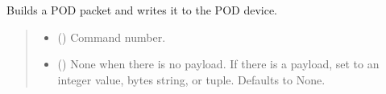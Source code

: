 \documentclass[letterpaper,10pt,english]{sphinxmanual}
\begin{document}
\begin{fulllineitems}
\begin{fulllineitems}
\end{fulllineitems}


\begin{fulllineitems}
\label{\detokenize{BasicPodProtocol:BasicPodProtocol.POD_Basics.WritePacket}}
\pysigstartsignatures
{}
\pysigstopsignatures
\sphinxAtStartPar
Builds a POD packet and writes it to the POD device.
\begin{quote}\begin{description}
\begin{itemize}
\item {} 
\sphinxAtStartPar
{} (\sphinxstyleliteralemphasis{\sphinxupquote{ | }}) \textendash{} Command number.

\item {} 
\sphinxAtStartPar
{} (\sphinxstyleliteralemphasis{\sphinxupquote{ | }}\sphinxstyleliteralemphasis{\sphinxupquote{ | }}\sphinxstyleliteralemphasis{\sphinxupquote{{[}}}\sphinxstyleliteralemphasis{\sphinxupquote{ | }}\sphinxstyleliteralemphasis{\sphinxupquote{{]}}}\sphinxstyleliteralemphasis{\sphinxupquote{, }}) \textendash{} None when there is no payload. If there                 is a payload, set to an integer value, bytes string, or tuple. Defaults to None.

\end{itemize}


\end{description}
\end{quote}
\end{fulllineitems}
\end{fulllineitems}
\end{document}
